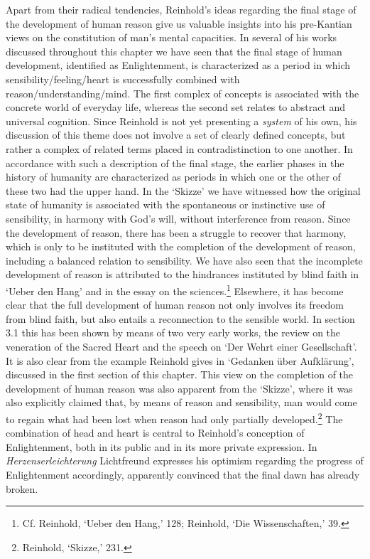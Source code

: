  Apart from their radical tendencies, Reinhold's ideas regarding the final stage of the development of human reason give us valuable insights into his pre{-}Kantian views on the constitution of man's mental capacities. In several of his works discussed throughout this chapter we have seen that the final stage of human development, identified as Enlightenment, is characterized as a period in which sensibility/feeling/heart is successfully combined with reason/understanding/mind. The first complex of concepts is associated with the concrete world of everyday life, whereas the second set relates to abstract and universal cognition. Since Reinhold is not yet presenting a \textit{system} of his own, his discussion of this theme does not involve a set of clearly defined concepts, but rather a complex of related terms placed in contradistinction to one another. In accordance with such a description of the final stage, the earlier phases in the history of humanity are characterized as periods in which one or the other of these two had the upper hand. In the `Skizze' we have witnessed how the original state of humanity is associated with the spontaneous or instinctive use of sensibility, in harmony with God's will, without interference from reason. Since the development of reason, there has been a struggle to recover that harmony, which is only to be instituted with the completion of the development of reason, including a balanced relation to sensibility. We have also seen that the incomplete development of reason is attributed to the hindrances instituted by blind faith in `Ueber den Hang' and in the essay on the sciences.\footnote{ Cf. Reinhold, `Ueber den Hang,' 128; Reinhold, `Die Wissenschaften,' 39.} Elsewhere, it has become clear that the full development of human reason not only involves its freedom from blind faith, but also entails a reconnection to the sensible world. In section 3.1 this has been shown by means of two very early works, the review on the veneration of the Sacred Heart and the speech on `Der Wehrt einer Gesellschaft'. It is also clear from the example Reinhold gives in `Gedanken \"{u}ber Aufkl\"{a}rung', discussed in the first section of this chapter. This view on the completion of the development of human reason was also apparent from the `Skizze', where it was also explicitly claimed that, by means of reason and sensibility, man would come to regain what had been lost when reason had only partially developed.\footnote{ Reinhold, `Skizze,' 231.} The combination of head and heart is central to Reinhold's conception of Enlightenment, both in its public and in its more private expression. In \textit{Herzenserleichterung} Lichtfreund expresses his optimism regarding the progress of Enlightenment accordingly, apparently convinced that the final dawn has already broken. 

